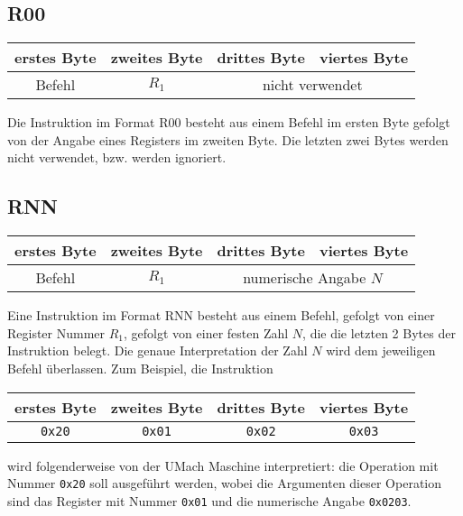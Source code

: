 \subsection{R00}
\label{R00}

\begin{center}
  \begin{tabular}{|*{4}{c|}} \hline
    erstes Byte & zweites Byte  & drittes Byte  & viertes Byte   \\\hline\hline
    Befehl      & $R_{1}$ & \multicolumn{2}{c|}{nicht verwendet} \\\hline
  \end{tabular}
\end{center}
Die Instruktion im Format R00 besteht aus einem Befehl im ersten Byte gefolgt
von der Angabe eines Registers im zweiten Byte. Die letzten zwei Bytes werden
nicht verwendet, bzw. werden ignoriert.

\subsection{RNN}
\label{RNN}

\begin{center}
  \begin{tabular}{|*{4}{c|}} \hline
    erstes Byte & zweites Byte  & drittes Byte  & viertes Byte   \\\hline\hline
    Befehl      & $R_{1}$ & \multicolumn{2}{c|}{numerische Angabe $N$} \\\hline
  \end{tabular}
\end{center}

Eine Instruktion im Format RNN besteht aus einem Befehl, gefolgt von einer
Register Nummer $R_{1}$, gefolgt von einer festen Zahl $N$, die die letzten
2 Bytes der Instruktion belegt.
Die genaue Interpretation der Zahl $N$ wird dem jeweiligen Befehl überlassen.
Zum Beispiel, die Instruktion
\begin{center}
  \begin{tabular}{|*{4}{c|}} \hline
    erstes Byte & zweites Byte  & drittes Byte  & viertes Byte \\\hline\hline
    \texttt{0x20} & \texttt{0x01} & \texttt{0x02} & \texttt{0x03} \\\hline
  \end{tabular}
\end{center}
wird folgenderweise von der UMach Maschine interpretiert: die Operation mit
Nummer \texttt{0x20} soll ausgeführt werden, wobei die Argumenten dieser
Operation sind das Register mit Nummer \texttt{0x01} und die numerische
Angabe \texttt{0x0203}.



